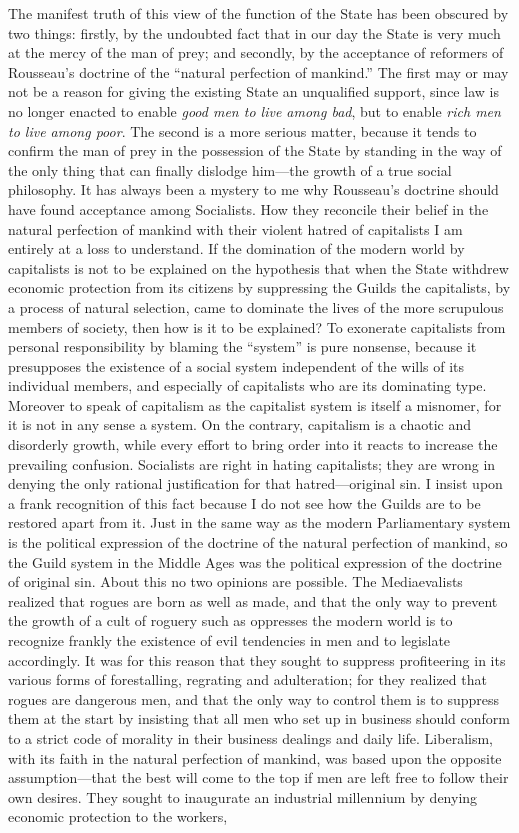 \documentclass{book}
\begin{document}
The manifest truth of this view of the function of the State has been obscured by two things: firstly, by the undoubted fact that in our day the State is very much at the mercy of the man of prey; and secondly, by the acceptance of reformers of Rousseau’s doctrine of the “natural perfection of mankind.” The first may or may not be a reason for giving the existing State an unqualified support, since law is no longer enacted to enable \emph{good men to live among bad}, but to enable \emph{rich men to live among poor}. The second is a more serious matter, because it tends to confirm the man of prey in the possession of the State by standing in the way of the only thing that can finally dislodge him—the growth of a true social philosophy. It has always been a mystery to me why Rousseau’s doctrine should have found acceptance among Socialists. How they reconcile their belief in the natural perfection of mankind with their violent hatred of capitalists I am entirely at a loss to understand. If the domination of the modern world by capitalists is not to be explained on the hypothesis that when the State withdrew economic protection from its citizens by suppressing the Guilds the capitalists, by a process of natural selection, came to dominate the lives of the more scrupulous members of society, then how is it to be explained? To exonerate capitalists from personal responsibility by blaming the “system” is pure nonsense, because it presupposes the existence of a social system independent of the wills of its individual members, and especially of capitalists who are its dominating type. Moreover to speak of capitalism as the capitalist system is itself a misnomer, for it is not in any sense a system. On the contrary, capitalism is a chaotic and disorderly growth, while every effort to bring order into it reacts to increase the prevailing confusion. Socialists are right in hating capitalists; they are wrong in denying the only rational justification for that hatred—original sin. I insist upon a frank recognition of this fact because I do not see how the Guilds are to be restored apart from it. Just in the same way as the modern Parliamentary system is the political expression of the doctrine of the natural perfection of mankind, so the Guild system in the Middle Ages was the political expression of the doctrine of original sin. About this no two opinions are possible. The Mediaevalists realized that rogues are born as well as made, and that the only way to prevent the growth of a cult of roguery such as oppresses the modern world is to recognize frankly the existence of evil tendencies in men and to legislate accordingly. It was for this reason that they sought to suppress profiteering in its various forms of forestalling, regrating and adulteration; for they realized that rogues are dangerous men, and that the only way to control them is to suppress them at the start by insisting that all men who set up in business should conform to a strict code of morality in their business dealings and daily life. Liberalism, with its faith in the natural perfection of mankind, was based upon the opposite assumption—that the best will come to the top if men are left free to follow their own desires. They sought to inaugurate an industrial millennium by denying economic protection to the workers, 
\end{document}
